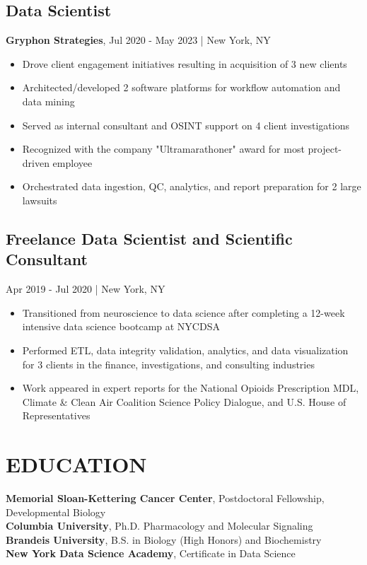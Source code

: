 \documentclass[11pt]{article}
\newenvironment{myitemize}
{ \begin{itemize}
	\setlength{\itemsep}{0pt}
	\setlength{\parskip}{0pt}
	\setlength{\parsep}{0pt}     }
{ \end{itemize}                  }
\begin{document}
\subsection*{Data Scientist}
{\bfseries Gryphon Strategies}, Jul 2020 - May 2023 | New York, NY
\begin{myitemize}
	\item Drove client engagement initiatives resulting in acquisition of 3 new clients
	\item Architected/developed 2 software platforms for workflow automation and data mining
	\item Served as internal consultant and OSINT support on 4 client investigations
	\item Recognized with the company "Ultramarathoner" award for most project-driven employee
	\item Orchestrated data ingestion, QC, analytics, and report preparation for 2 large lawsuits
\end{myitemize}

\subsection*{Freelance Data Scientist and Scientific Consultant} Apr 2019 - Jul 2020 | New York, NY
\begin{myitemize}
	\item Transitioned from neuroscience to data science after completing a 12-week intensive data science bootcamp at NYCDSA 
	\item Performed ETL, data integrity validation, analytics, and data visualization for 3 clients in the finance, investigations, and consulting industries
	\item Work appeared in expert reports for the National Opioids Prescription MDL, Climate \& Clean Air Coalition Science Policy Dialogue, and U.S. House of Representatives 
\end{myitemize}

\section*{EDUCATION}
{\bfseries Memorial Sloan-Kettering Cancer Center}, Postdoctoral Fellowship, Developmental Biology\\
{\bfseries Columbia University}, Ph.D. Pharmacology and Molecular Signaling \\
{\bfseries Brandeis University}, B.S. in Biology (High Honors) and Biochemistry \\
{\bfseries New York Data Science Academy}, Certificate in Data Science
\end{document}
